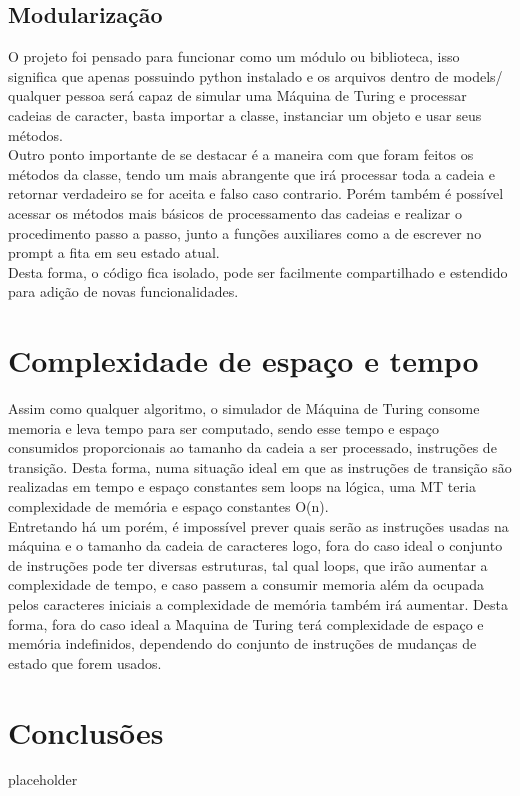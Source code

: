 \documentclass[a4paper, 12pt]{article}
\begin{document}
\subsection{Modularização}
O projeto foi pensado para funcionar como um módulo ou biblioteca, isso significa que apenas possuindo python instalado e os arquivos dentro de models/ qualquer pessoa será capaz de simular uma Máquina de Turing e processar cadeias de caracter, basta importar a classe, instanciar um objeto e usar seus métodos.\\
Outro ponto importante de se destacar é a maneira com que foram feitos os métodos da classe, tendo um mais abrangente que irá processar toda a cadeia e retornar verdadeiro se for aceita e falso caso contrario. Porém também é possível acessar os métodos mais básicos de processamento das cadeias e realizar o procedimento passo a passo, junto a funções auxiliares como a de escrever no prompt a fita em seu estado atual.\\
Desta forma, o código fica isolado, pode ser facilmente compartilhado e estendido para adição de novas funcionalidades.\\

\section{Complexidade de espaço e tempo}
Assim como qualquer algoritmo, o simulador de Máquina de Turing consome memoria e leva tempo para ser computado, sendo esse tempo e espaço consumidos proporcionais ao tamanho da cadeia a ser processado, instruções de transição. Desta forma, numa situação ideal em que as instruções de transição são realizadas em tempo e espaço constantes sem loops na lógica, uma MT teria complexidade de memória e espaço constantes O(n).\\
Entretando há um porém, é impossível prever quais serão as instruções usadas na máquina e o tamanho da cadeia de caracteres logo, fora do caso ideal o conjunto de instruções pode ter diversas estruturas, tal qual loops, que irão aumentar a complexidade de tempo, e caso passem a consumir memoria além da ocupada pelos caracteres iniciais a complexidade de memória também irá aumentar.
Desta forma, fora do caso ideal a Maquina de Turing terá complexidade de espaço e memória indefinidos, dependendo do conjunto de instruções de mudanças de estado que forem usados.


\newpage
\section{Conclusões}
placeholder
\end{document}
